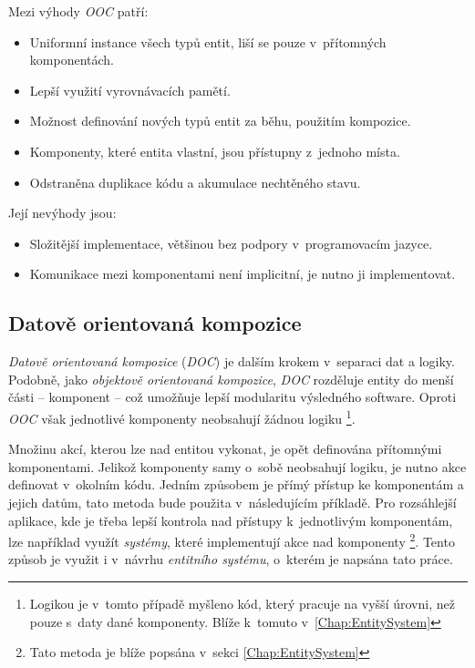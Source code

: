 \noindent Mezi výhody \emph{OOC} patří: 
\begin{itemize}
	\item Uniformní instance všech typů entit, liší se pouze v~přítomných komponentách.
	\item Lepší využití vyrovnávacích pamětí.
	\item Možnost definování nových typů entit za běhu, použitím kompozice.
	\item Komponenty, které entita vlastní, jsou přístupny z~jednoho místa.
	\item Odstraněna duplikace kódu a akumulace nechtěného stavu.
\end{itemize}

\noindent Její nevýhody jsou: 
\begin{itemize}
	\item Složitější implementace, většinou bez podpory v~programovacím jazyce.
	\item Komunikace mezi komponentami není implicitní, je nutno ji implementovat. 
\end{itemize}

\pagebreak

\subsection{Datově orientovaná kompozice}
\label{Chap:DOC}

\emph{Datově orientovaná kompozice} (\emph{DOC}) je dalším krokem v~separaci dat a logiky. Podobně, jako \emph{objektově orientovaná kompozice}, \emph{DOC} rozděluje entity do menší části -- komponent -- což umožňuje lepší modularitu výsledného software. Oproti \emph{OOC} však jednotlivé komponenty neobsahují žádnou logiku \footnote{Logikou je v~tomto případě myšleno kód, který pracuje na vyšší úrovni, než pouze s~daty dané komponenty. Blíže k~tomuto v~\ref{Chap:EntitySystem}}.

Množinu akcí, kterou lze nad entitou vykonat, je opět definována přítomnými komponentami. Jelikož komponenty samy o~sobě neobsahují logiku, je nutno akce definovat v~okolním kódu. Jedním způsobem je přímý přístup ke komponentám a jejich datům, tato metoda bude použita v~následujícím příkladě. Pro rozsáhlejší aplikace, kde je třeba lepší kontrola nad přístupy k~jednotlivým komponentám, lze například využít \emph{systémy}, které implementují akce nad komponenty \footnote{Tato metoda je blíže popsána v~sekci \ref{Chap:EntitySystem}}. Tento způsob je využit i v~návrhu \emph{entitního systému}, o~kterém je napsána tato práce.

